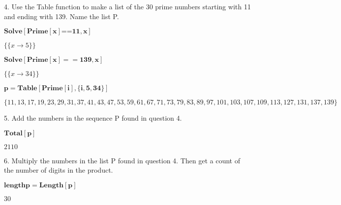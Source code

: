 \documentclass{article}
\begin{document}
4. Use the Table function to make a list of the 30 prime numbers starting with 11 and ending with 139. Name the list P.\\


\begin{doublespace}
\noindent\(\pmb{\text{Solve}[\text{Prime}[x]\text{==}11,x]}\)
\end{doublespace}

\begin{doublespace}
\noindent\(\{\{x\to 5\}\}\)
\end{doublespace}

\begin{doublespace}
\noindent\(\pmb{\text{Solve}[\text{Prime}[x]==139,x]}\)
\end{doublespace}

\begin{doublespace}
\noindent\(\{\{x\to 34\}\}\)
\end{doublespace}

\begin{doublespace}
\noindent\(\pmb{p=\text{Table}[\text{Prime}[i],\{i,5,34\}]}\)
\end{doublespace}

\begin{doublespace}
\noindent\(\{11,13,17,19,23,29,31,37,41,43,47,53,59,61,67,71,73,79,83,89,97,101,103,107,109,113,127,131,137,139\}\)
\end{doublespace}

5. Add the numbers in the sequence P found in question 4.\\


\begin{doublespace}
\noindent\(\pmb{\text{Total}[p]}\)
\end{doublespace}

\begin{doublespace}
\noindent\(2110\)
\end{doublespace}

6. Multiply the numbers in the list P found in question 4. Then get a count of the number of digits in the product.\\


\begin{doublespace}
\noindent\(\pmb{\text{lengthp}=\text{Length}[p]}\)
\end{doublespace}

\begin{doublespace}
\noindent\(30\)
\end{doublespace}
\end{document}
